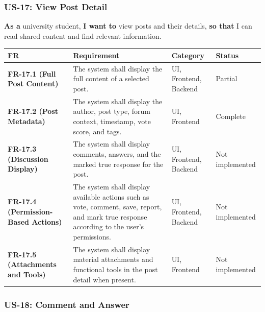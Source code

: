 \documentclass[12pt]{article}
\renewcommand{\baselinestretch}{1.5}
\begin{document}
\hypertarget{sec:us-17-view-post-detail}{}
\subsubsection*{US-17: View Post Detail}
\par\medskip

\textbf{As a} university student, \textbf{I want to} view posts and their details, \textbf{so that} I can read shared content and find relevant information.
\par\medskip

\begingroup
\small
\renewcommand{\baselinestretch}{1.0}\selectfont
\renewcommand{\arraystretch}{1.15}
\setlength{\tabcolsep}{6pt}
\begin{longtable}{|>{\raggedright\arraybackslash}p{}|>{\raggedright\arraybackslash}p{}|>{\raggedright\arraybackslash}p{}|>{\raggedright\arraybackslash}p{}|}
\hline
\textbf{FR} & \textbf{Requirement} & \textbf{Category} & \textbf{Status} \\ \hline
\endhead
\textbf{FR-17.1 (Full Post Content)} & The system shall display the full content of a selected post. & UI, Frontend, Backend & Partial \\ \hline
\textbf{FR-17.2 (Post Metadata)} & The system shall display the author, post type, forum context, timestamp, vote score, and tags. & UI, Frontend & Complete \\ \hline
\textbf{FR-17.3 (Discussion Display)} & The system shall display comments, answers, and the marked true response for the post. & UI, Frontend, Backend & Not implemented \\ \hline
\textbf{FR-17.4 (Permission-Based Actions)} & The system shall display available actions such as vote, comment, save, report, and mark true response according to the user's permissions. & UI, Frontend, Backend & Not implemented \\ \hline
\textbf{FR-17.5 (Attachments and Tools)} & The system shall display material attachments and functional tools in the post detail when present. & UI, Frontend & Not implemented \\ \hline
\end{longtable}
\endgroup
\par\medskip

\hypertarget{sec:us-18-comment-and-answer}{}
\subsubsection*{US-18: Comment and Answer}
\par\medskip
\end{document}
